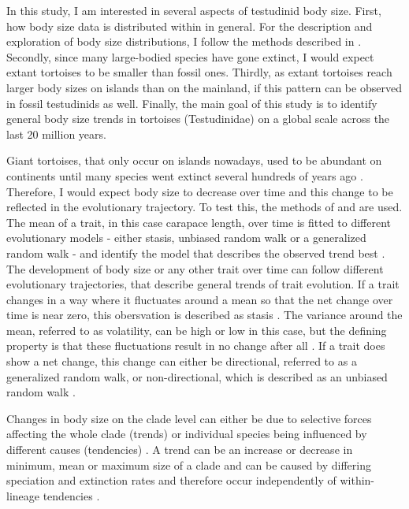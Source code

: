 In this study, I am interested in several aspects of testudinid body size.
First, how  body size data is distributed within \T in general. For the description and exploration of body size distributions, I follow the methods described in \cite{Lyons2008}.
Secondly, since many large-bodied species have gone extinct, I would expect extant tortoises to be smaller than fossil ones. Thirdly, as extant tortoises reach larger body sizes on islands than on the mainland, if this pattern can be observed in fossil testudinids as well.
Finally, the main goal of this study is to identify general body size trends in tortoises (Testudinidae) on a global scale across the last 20 million years. 

Giant tortoises, that only occur on islands nowadays, used to be abundant on continents until many species went extinct several hundreds of years ago \citep{.}. 
Therefore, I would expect body size to decrease over time and this change to be reflected in the evolutionary trajectory. 
To test this, the methods of \cite{Hunt2006,Hunt2008} and \cite{Hunt2010} are used. The mean of a trait, in this case carapace length, over time is fitted to different evolutionary models - either stasis, unbiased random walk or a generalized random walk - and identify the model that describes the observed trend best \citep{.}.
The development of body size or any other trait over time can follow different evolutionary trajectories, that describe general trends of trait evolution. If a trait changes in a way where it fluctuates around a mean so that the net change over time is near zero, this obersvation is described as stasis \citep{Hunt2006}. The variance around the mean, referred to as volatility, can be high or low in this case, but the defining property is that these fluctuations result in no change after all \citep{Hunt2006}.
If a trait does show a net change, this change can either be directional, referred to as a generalized random walk, or non-directional, which is described as an unbiased random walk \citep{.}.

Changes in body size on the clade level can either be due to selective forces affecting the whole clade (trends) or individual species being influenced by different causes (tendencies) \citep{Hunt2006}. A trend can be an increase or decrease in minimum, mean or maximum size of a clade and can be caused by differing speciation and extinction rates and therefore occur independently of within-lineage tendencies \citep{Smith2016}.


